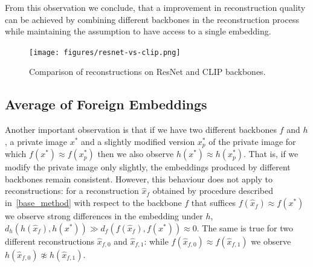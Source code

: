 \documentclass[10pt,twocolumn]{article}
\begin{document}
From this observation we conclude, that a improvement in reconstruction quality can be achieved by combining different backbones in the reconstruction process while maintaining the assumption to have access to a single embedding.
\begin{figure}[ht]
    \centering
    \texttt{[image: figures/resnet-vs-clip.png]}
    \caption{
        Comparison of reconstructions on ResNet and CLIP backbones.
    }
    \label{fig:resnet_vs_clip}
\end{figure}

\subsection{Average of Foreign Embeddings}
Another important observation is that if we have two different backbones $f$ and $h$, a private image $x^*$ and a slightly modified version $x^*_p$ of the private image for which $f(x^*)\approx f(x^*_p)$ then we also observe $h(x^*)\approx h(x^*_p)$.
That is, if we modify the private image only slightly, the embeddings produced by different backbones remain consistent.
However, this behaviour does not apply to reconstructions: for a reconstruction $\hat x_f$ obtained by procedure described in~\ref{base_method} with respect to the backbone $f$ that suffices $f(\hat x_f)\approx f(x^*)$ we observe strong differences in the embedding under $h$, $d_h(h(\hat x_f),h(x^*)) \gg d_f(f(\hat x_f),f(x^*))\approx 0$.
The same is true for two different reconstructions $\hat x_{f,0}$ and $\hat x_{f,1}$: while $f(\hat x_{f,0})\approx f(\hat x_{f,1})$ we observe $h(\hat x_{f,0})\not\approx h(\hat x_{f,1})$.
\end{document}
